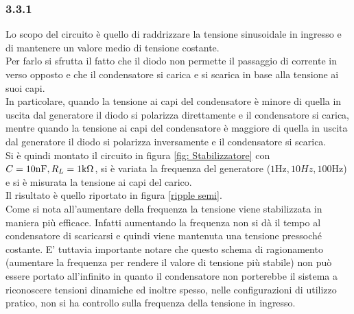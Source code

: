 \subsubsection{3.3.1}
Lo scopo del circuito è quello di raddrizzare la tensione sinusoidale in ingresso e di mantenere un valore medio di tensione costante.\\
Per farlo si sfrutta il fatto che il diodo non permette il passaggio di corrente in verso opposto e che il condensatore si carica e si scarica in base alla tensione ai suoi capi.\\
In particolare, quando la tensione ai capi del condensatore è minore di quella in uscita dal generatore il diodo si polarizza direttamente e il condensatore si carica,
mentre quando la tensione ai capi del condensatore è maggiore di quella in uscita dal generatore il diodo si polarizza inversamente e il condensatore si scarica.\\
Si è quindi montato il circuito in figura \ref{fig: Stabilizzatore} con $C=10\unit{\nF},R_L=1\unit{\kohm}$, si è variata la frequenza del generatore ($1\unit{\Hz},10\unit{Hz},100\unit{\Hz}$) e si è misurata la tensione ai capi del carico.\\
Il risultato è quello riportato in figura \ref{ripple semi}.\\
Come si nota all'aumentare della frequenza la tensione viene stabilizzata in maniera più efficace. Infatti aumentando la frequenza non si dà il tempo al condensatore di scaricarsi e quindi viene mantenuta una tensione pressoché costante. E' tuttavia importante notare che questo schema di ragionamento (aumentare la frequenza per rendere il valore di tensione più stabile) non può essere portato all'infinito in quanto il condensatore non porterebbe il sistema a riconoscere tensioni dinamiche ed inoltre spesso, nelle configurazioni di utilizzo pratico, non si ha controllo sulla frequenza della tensione in ingresso.
